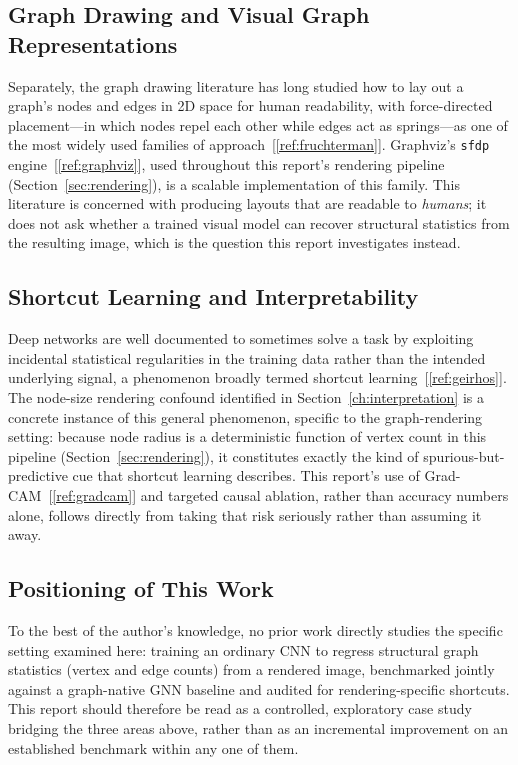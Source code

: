 \documentclass[11pt,letterpaper]{article}
\numberwithin{equation}{section}
\numberwithin{figure}{section}
\numberwithin{table}{section}
\begin{document}
\subsection{Graph Drawing and Visual Graph Representations}
Separately, the graph drawing literature has long studied how to lay out a graph's nodes and edges in 2D space for human readability, with force-directed placement---in which nodes repel each other while edges act as springs---as one of the most widely used families of approach~[\ref{ref:fruchterman}]. Graphviz's \texttt{sfdp} engine~[\ref{ref:graphviz}], used throughout this report's rendering pipeline (Section~\ref{sec:rendering}), is a scalable implementation of this family. This literature is concerned with producing layouts that are readable to \emph{humans}; it does not ask whether a trained visual model can recover structural statistics from the resulting image, which is the question this report investigates instead.

\subsection{Shortcut Learning and Interpretability}
Deep networks are well documented to sometimes solve a task by exploiting incidental statistical regularities in the training data rather than the intended underlying signal, a phenomenon broadly termed shortcut learning~[\ref{ref:geirhos}]. The node-size rendering confound identified in Section~\ref{ch:interpretation} is a concrete instance of this general phenomenon, specific to the graph-rendering setting: because node radius is a deterministic function of vertex count in this pipeline (Section~\ref{sec:rendering}), it constitutes exactly the kind of spurious-but-predictive cue that shortcut learning describes. This report's use of Grad-CAM~[\ref{ref:gradcam}] and targeted causal ablation, rather than accuracy numbers alone, follows directly from taking that risk seriously rather than assuming it away.

\subsection{Positioning of This Work}
To the best of the author's knowledge, no prior work directly studies the specific setting examined here: training an ordinary CNN to regress structural graph statistics (vertex and edge counts) from a rendered image, benchmarked jointly against a graph-native GNN baseline and audited for rendering-specific shortcuts. This report should therefore be read as a controlled, exploratory case study bridging the three areas above, rather than as an incremental improvement on an established benchmark within any one of them.
\end{document}

